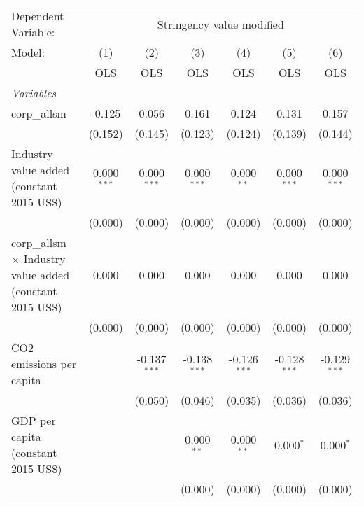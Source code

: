 
\begingroup
\centering
\begin{tabular}{lcccccc}
   \toprule
   Dependent Variable: & \multicolumn{6}{c}{Stringency value modified}\\
   Model:                                                            & (1)           & (2)            & (3)            & (4)            & (5)            & (6)\\  
                                                                     &  OLS          & OLS            & OLS            & OLS            & OLS            & OLS\\  
   \midrule
   \emph{Variables}\\
   corp\_allsm                                                       & -0.125        & 0.056          & 0.161          & 0.124          & 0.131          & 0.157\\   
                                                                     & (0.152)       & (0.145)        & (0.123)        & (0.124)        & (0.139)        & (0.144)\\   
   Industry value added (constant 2015 US\$)                         & 0.000$^{***}$ & 0.000$^{***}$  & 0.000$^{***}$  & 0.000$^{**}$   & 0.000$^{***}$  & 0.000$^{***}$\\   
                                                                     & (0.000)       & (0.000)        & (0.000)        & (0.000)        & (0.000)        & (0.000)\\   
   corp\_allsm $\times$ Industry value added (constant 2015 US\$)    & 0.000         & 0.000          & 0.000          & 0.000          & 0.000          & 0.000\\   
                                                                     & (0.000)       & (0.000)        & (0.000)        & (0.000)        & (0.000)        & (0.000)\\   
   CO2 emissions per capita                                          &               & -0.137$^{***}$ & -0.138$^{***}$ & -0.126$^{***}$ & -0.128$^{***}$ & -0.129$^{***}$\\   
                                                                     &               & (0.050)        & (0.046)        & (0.035)        & (0.036)        & (0.036)\\   
   GDP per capita (constant 2015 US\$)                               &               &                & 0.000$^{**}$   & 0.000$^{**}$   & 0.000$^{*}$    & 0.000$^{*}$\\   
                                                                     &               &                & (0.000)        & (0.000)        & (0.000)        & (0.000)\\   

\end{tabular}
